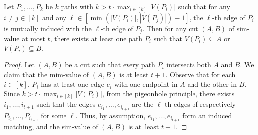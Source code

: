 \documentclass[a4paper,UKenglish,cleveref,hyperref,autoref]{lipics-v2021}
\begin{document}
\begin{lemma}\label{lem:cut-doesnt-cut}
Let $P_1, \dots, P_k$ be $k$ paths with $k > t \cdot \max_{i \in [k]} |V(P_i)|$ such that for any $i \neq j \in [k]$ and any $\ell \in [\min(|V(P_i)|,|V(P_j)|)-1]$, the $\ell$-th edge of $P_i$ is mutually induced with the $\ell$-th edge of $P_j$.
Then for any cut $(A, B)$ of sim-value at most $t$, there exists at least one path $P_i$ such that $V(P_i)\subseteq A$ or $V(P_i)\subseteq B$.
\end{lemma}
\begin{proof}
	Let $(A, B)$ be a cut such that every path $P_i$ intersects both $A$ and $B$.
	We claim that the mim-value of $(A,B)$ is at least $t+1$.
	Observe that for each $i \in [k]$, $P_i$ has at least one edge $e_i$ with one endpoint in $A$ and the other in $B$.
	Since $k > t \cdot \max_{i \in [k]} |V(P_i)|$, from the pigeonhole principle, there exists $i_1,\dots,i_{t+1}$ such that the edges $e_{i_1},\dots,e_{i_{t+1}}$ are the $\ell$-th edges of respectively $P_{i_1}, \ldots,P_{i_{t+1}}$ for some $\ell$.
        Thus, by assumption, $e_{i_1},\dots,e_{i_{t+1}}$ form an induced matching, and the sim-value of $(A,B)$ is at~least $t+1$.
\end{proof}
\end{document}
